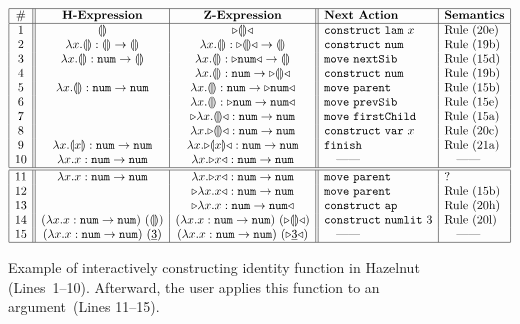 \documentclass{llncs}
\begin{document}
\begin{figure}[t]
\[
\begin{array}{|c||c|c||l|l|}
\hline
\# & \textbf{H-Expression} & \textbf{Z-Expression} & \textbf{Next Action} & \textbf{Semantics}
\\ 
\hline
1 &
\hhole{} &
\zwsel{\hhole{}}
&
\aConstruct{\flam{x}} & \refrule{20e}
\\ 2 &
\hlam{x}{\hhole{}} : \tarr{\hhole{}}{\hhole{}} &
\hlam{x}{\hhole{}} : \tarr{\zwsel{\hhole{}}}{\hhole{}}
&
\aConstruct{\fnum{}} & \refrule{19b}
\\ 3 &
\hlam{x}{\hhole{}} : \tarr{\tnum{}}{\hhole{}} &
\hlam{x}{\hhole{}} : \tarr{\zwsel{\tnum{}}}{\hhole{}}
&
\aMove{\dNext{}} & \refrule{15d}
\\ 4 &
&
\hlam{x}{\hhole{}} : \tarr{\tnum}{\zwsel{\hhole{}}}
&
\aConstruct{\fnum{}} & \refrule{19b}
\\ 5 &
\hlam{x}{\hhole{}} : \tarr{\tnum{}}{\tnum{}} &
\hlam{x}{\hhole{}} : \tarr{\tnum{}}{\zwsel{\tnum{}}}
&
\aMove{\dParent{}} & \refrule{15b}
\\ 6 &
&
\hlam{x}{\hhole{}} : \zwsel{\tarr{\tnum{}}{\tnum{}}}
&
\aMove{\dPrev{}} & \refrule{15e}
\\ 7 &
&
\zwsel{\hlam{x}{\hhole{}}} : \tarr{\tnum{}}{\tnum{}}
&
\aMove{\dChild{}} & \refrule{15a}
\\ 8 &
&
\hlam{x}{\zwsel{\hhole{}}} : \tarr{\tnum{}}{\tnum{}}
&
\aConstruct{\fvar{x}} & \refrule{20c}
\\ 9 &
\hlam{x}{\hhole{x}} : \tarr{\tnum{}}{\tnum{}}
&
\hlam{x}{\zwsel{\hhole{x}}} : \tarr{\tnum{}}{\tnum{}}
&
\aFinish{} & \refrule{21a}
\\ 10 &
\hlam{x}{{x}} : \tarr{\tnum{}}{\tnum{}}
&
\hlam{x}{\zwsel{{x}}} : \tarr{\tnum{}}{\tnum{}}
&
\quad\textrm{---{}---}
&
\quad\textrm{---{}---}
\\ 
\hline
\hline
11 &
\hlam{x}{{x}} : \tarr{\tnum{}}{\tnum{}}
&
\hlam{x}{\zwsel{{x}}} : \tarr{\tnum{}}{\tnum{}}
&
\aMove{\dParent{}} & ?
\\ 12 &
&
\zwsel{\hlam{x}{{{x}}}} : \tarr{\tnum{}}{\tnum{}}
&
\aMove{\dParent{}} & \refrule{15b}
\\ 13 &
&
\zwsel{\hlam{x}{{{x}}} : \tarr{\tnum{}}{\tnum{}}}
&
\aConstruct{\fap{}} & \refrule{20h}
\\ 14 &
\hapP{\hlam{x}{{x}} : \tarr{\tnum{}}{\tnum{}}}{\hhole{}}
&
\hapP{\hlam{x}{{x}} : \tarr{\tnum{}}{\tnum{}}}{\zwsel{\hhole{}}}
&
\aConstruct{\fnumlit{3}} & \refrule{20l}
\\ 15 &
\hapP{\hlam{x}{{x}} : \tarr{\tnum{}}{\tnum{}}}{{\hnum{3}}}
&
\hapP{\hlam{x}{{x}} : \tarr{\tnum{}}{\tnum{}}}{\zwsel{{\hnum{3}}}}
&
\quad\textrm{---{}---}
&
\quad\textrm{---{}---}
\\
\hline
\end{array}
\]
\caption{Example of interactively constructing identity function in Hazelnut (Lines~1--10).
  Afterward, the user applies this function to an argument~(Lines 11--15).}
\label{fig:first-example}
\end{figure}
\end{document}
